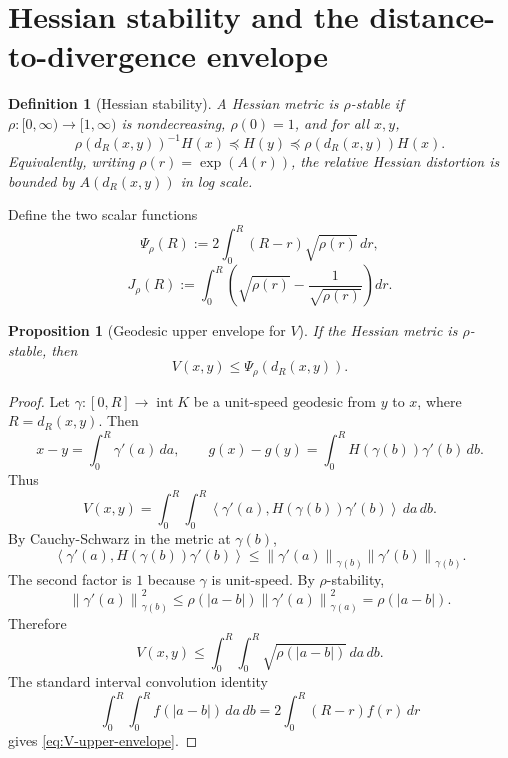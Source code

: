 \documentclass[11pt]{article}
\newtheorem{proposition}[theorem]{Proposition}
\newtheorem{definition}[theorem]{Definition}
\newcommand{\ip}[2]{\left\langle #1,#2\right\rangle}
\newcommand{\norm}[1]{\left\|#1\right\|}
\newcommand{\distR}{d_R}
\begin{document}
\section{Hessian stability and the distance-to-divergence envelope}

\begin{definition}[Hessian stability]
A Hessian metric is $\rho$-stable if $\rho:[0,\infty)\to[1,\infty)$ is nondecreasing, $\rho(0)=1$, and for all $x,y$,
\begin{equation}
  \rho(\distR(x,y))^{-1}H(x)
  \preceq
  H(y)
  \preceq
  \rho(\distR(x,y))H(x).              \label{eq:rho-stability}
\end{equation}
Equivalently, writing $\rho(r)=\exp(A(r))$, the relative Hessian distortion is bounded by $A(\distR(x,y))$ in log scale.
\end{definition}

Define the two scalar functions
\begin{equation}
  \Psi_\rho(R):=2\int_0^R (R-r)\sqrt{\rho(r)}\,dr,          \label{eq:Psi-def}
\end{equation}
\begin{equation}
  J_\rho(R):=\int_0^R\left(\sqrt{\rho(r)}-\frac{1}{\sqrt{\rho(r)}}\right)dr.    \label{eq:J-def}
\end{equation}

\begin{proposition}[Geodesic upper envelope for $V$]
If the Hessian metric is $\rho$-stable, then
\begin{equation}
  V(x,y)\le \Psi_\rho(\distR(x,y)).                   \label{eq:V-upper-envelope}
\end{equation}
\end{proposition}

\begin{proof}
Let $\gamma:[0,R]\to\operatorname{int}K$ be a unit-speed geodesic from $y$ to $x$, where $R=\distR(x,y)$. Then
\[
  x-y=\int_0^R\gamma'(a)\,da,
  \qquad
  g(x)-g(y)=\int_0^R H(\gamma(b))\gamma'(b)\,db.
\]
Thus
\[
  V(x,y)=\int_0^R\int_0^R
  \ip{\gamma'(a)}{H(\gamma(b))\gamma'(b)}\,da\,db.
\]
By Cauchy-Schwarz in the metric at $\gamma(b)$,
\[
  \ip{\gamma'(a)}{H(\gamma(b))\gamma'(b)}
  \le
  \norm{\gamma'(a)}_{\gamma(b)}\norm{\gamma'(b)}_{\gamma(b)}.
\]
The second factor is $1$ because $\gamma$ is unit-speed.  By $\rho$-stability,
\[
  \norm{\gamma'(a)}_{\gamma(b)}^2
  \le
  \rho(|a-b|)\norm{\gamma'(a)}_{\gamma(a)}^2
  =\rho(|a-b|).
\]
Therefore
\[
  V(x,y)\le \int_0^R\int_0^R \sqrt{\rho(|a-b|)}\,da\,db.
\]
The standard interval convolution identity
\[
  \int_0^R\int_0^R f(|a-b|)\,da\,db
  =2\int_0^R(R-r)f(r)\,dr
\]
gives \eqref{eq:V-upper-envelope}.
\end{proof}
\end{document}
